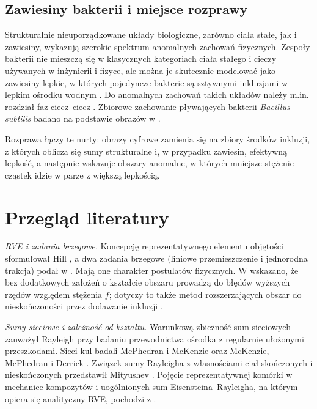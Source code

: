 \documentclass[12pt,a4paper,twoside,openright]{report}
\theoremstyle{definition}
\theoremstyle{remark}
\begin{document}
{\section{Zawiesiny bakterii i miejsce rozprawy}
Strukturalnie nieuporządkowane układy biologiczne, zarówno ciała stałe, jak i zawiesiny, wykazują szerokie spektrum anomalnych zachowań fizycznych. Zespoły bakterii nie mieszczą się w klasycznych kategoriach ciała stałego i cieczy używanych w inżynierii i fizyce, ale można je skutecznie modelować jako zawiesiny lepkie, w których pojedyncze bakterie są sztywnymi inkluzjami w lepkim ośrodku wodnym \cite{ligocki2025study}. Do anomalnych zachowań takich układów należy m.in. rozdział faz ciecz--ciecz \cite{alberti2019considerations}. Zbiorowe zachowanie pływających bakterii \emph{Bacillus subtilis} badano na podstawie obrazów w \cite{ariel2018collective}.

Rozprawa łączy te nurty: obrazy cyfrowe zamienia się na zbiory środków inkluzji, z których oblicza się sumy strukturalne i, w przypadku zawiesin, efektywną lepkość, a następnie wskazuje obszary anomalne, w których mniejsze stężenie cząstek idzie w parze z większą lepkością.
}

\chapter*{Przegląd literatury}

\emph{RVE i zadania brzegowe.} Koncepcję reprezentatywnego elementu objętości sformułował Hill \cite{hill1963elastic}, a dwa zadania brzegowe (liniowe przemieszczenie i jednorodna trakcja) podał w \cite{hill1965self}. Mają one charakter postulatów fizycznych. W \cite{czapla2025computational,mityushev2025computationalpart3} wskazano, że bez dodatkowych założeń o kształcie obszaru prowadzą do błędów wyższych rzędów względem stężenia $f$; dotyczy to także metod rozszerzających obszar do nieskończoności przez dodawanie inkluzji \cite{czapla2025computational,mityushev2022effective1}.

\emph{Sumy sieciowe i zależność od kształtu.} Warunkową zbieżność sum sieciowych zauważył Rayleigh \cite{rayleigh1892lvi} przy badaniu przewodnictwa ośrodka z regularnie ułożonymi przeszkodami. Sieci kul badali McPhedran i McKenzie \cite{mcphedran1978conductivity} oraz McKenzie, McPhedran i Derrick \cite{mckenzie1978conductivity}. Związek sumy Rayleigha z własnościami ciał skończonych i nieskończonych przedstawił Mityushev \cite{mityushev1997transport}. Pojęcie reprezentatywnej komórki w mechanice kompozytów i uogólnionych sum Eisensteina--Rayleigha, na którym opiera się analityczny RVE, pochodzi z \cite{mityushev2006representative}.
\end{document}
